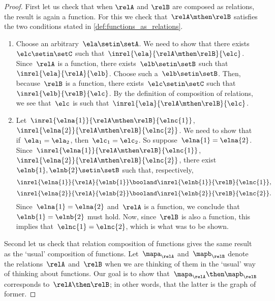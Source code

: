 \begin{proof}
    First let us check that when $\relA$ and $\relB$ are composed as relations, the result is again a function.
    For this we check that~$\relA \mthen \relB$ satisfies the two conditions stated in \cref{def:functions_as_relations}.

    \begin{enumerate}
        \item Choose an arbitrary~$\ela \setin \setA$.
              We need to show that there exists~$\elc \setin \setC$ such that~$\inrel{\ela}{\relA \mthen \relB}{\elc}$.
              Since~$\relA$ is a function, there exists~$\elb \setin \setB$ such that~$\inrel{\ela}{\relA}{\elb}$.
              Choose such a~$\elb \setin \setB$.
              Then, because~$\relB$ is a function, there exists~$\elc \setin \setC$ such that~$\inrel{\elb}{\relB}{\elc}$.
              By the definition of composition of relations, we see that~$\elc$ is such that~$\inrel{\ela}{\relA \mthen \relB}{\elc}$.
        \item Let~$\inrel{\elna{1}}{\relA \mthen \relB}{\elnc{1}}$,~$\inrel{\elna{2}}{\relA \mthen \relB}{\elnc{2}}$.
              We need to show that if~$\ela_1 = \ela_2$, then~$\elc_1 = \elc_2$.
              So suppose~$\elna{1} = \elna{2}$.
              Since~$\inrel{\elna{1}}{\relA \mthen \relB}{\elnc{1}}$,~$\inrel{\elna{2}}{\relA \mthen \relB}{\elnc{2}}$, there exist~$\elnb{1}, \elnb{2} \setin \setB$ such that, respectively,
              \begin{equation*}
                  \inrel{\elna{1}}{\relA}{\elnb{1}} \booland \inrel{\elnb{1}}{\relB}{\elnc{1}},
              \end{equation*}
              \begin{equation*}
                  \inrel{\elna{2}}{\relA}{\elnb{2}} \booland \inrel{\elnb{2}}{\relB}{\elnc{2}}.
              \end{equation*}
              Since~$\elna{1} = \elna{2}$ and~$\relA$ is a function, we conclude that~$\elnb{1} = \elnb{2}$ must hold.
              Now, since~$\relB$ is also a function, this implies that~$\elnc{1} = \elnc{2}$, which is what was to be shown.
    \end{enumerate}

    Second let us check that relation composition of functions gives the same result as the `usual' composition of functions.
    Let~$\mapa_\relA$ and~$\mapb_\relB$ denote the relations~$\relA$ and~$\relB$ when we are thinking of them in the `usual' way of thinking about functions.
    Our goal is to show that~$\mapa_\relA \then \mapb_\relB$ corresponds to~$\relA \then \relB$; in other words, that the latter is the graph of former.


\end{proof}
